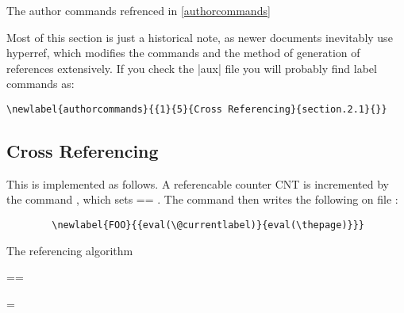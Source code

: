 The author commands refrenced in \autoref{authorcommands}

Most of this section is just a historical note, as newer documents
inevitably use hyperref, which modifies the commands and the method
of generation of references extensively. If you check the |aux| file
you will probably find label commands as:

\begin{verbatim}
\newlabel{authorcommands}{{1}{5}{Cross Referencing}{section.2.1}{}}
\end{verbatim}

 \subsection{Cross Referencing}

    \begin{teX}
    \end{teX}

  This is implemented as follows.  A referencable counter  CNT  is
  incremented by the command   , which sets
   == .   The command
   then writes the following on file  :

\begin{verbatim}
        \newlabel{FOO}{{eval(\@currentlabel)}{eval(\thepage)}}}
\end{verbatim}

\LinesNumbered
\begin{algorithm}
\caption{The referencing algorithm}
   ==

   =
\end{algorithm}




